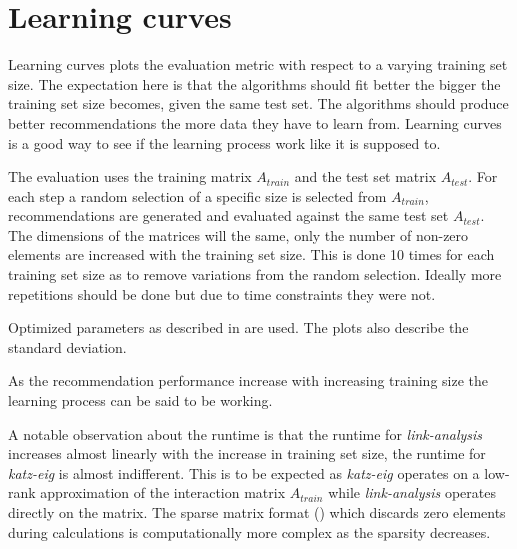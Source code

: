 
\section{Learning curves}\label{sec:graphs:learning_curves}

Learning curves plots the evaluation metric with respect to a varying training set size. The expectation here is that the algorithms should fit better the bigger the training set size becomes, given the same test set. The algorithms should produce better recommendations the more data they have to learn from. Learning curves is a good way to see if the learning process work like it is supposed to.

The evaluation uses the training matrix $A_{train}$ and the test set matrix $A_{test}$. For each step a random selection of a specific size is selected from $A_{train}$, recommendations are generated and evaluated against the same test set $A_{test}$. The dimensions of the matrices will the same, only the number of non-zero elements are increased with the training set size. This is done 10 times for each training set size as to remove variations from the random selection. Ideally more repetitions should be done but due to time constraints they were not.

Optimized parameters as described in  are used. The plots also describe the standard deviation.

\FloatBarrier

As the recommendation performance increase with increasing training size the learning process can be said to be working.

A notable observation about the runtime is that the runtime for \textit{link-analysis} increases almost linearly with the increase in training set size, the runtime for \textit{katz-eig} is almost indifferent. This is to be expected as \textit{katz-eig} operates on a low-rank approximation of the interaction matrix $A_{train}$ while \textit{link-analysis} operates directly on the matrix. The sparse matrix format () which discards zero elements during calculations is computationally more complex as the sparsity decreases.

